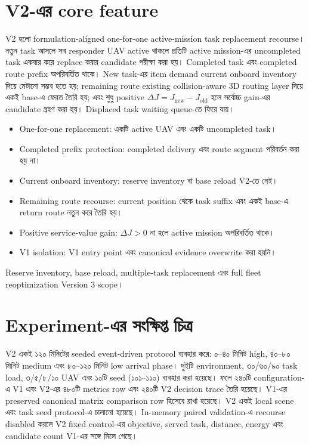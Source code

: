 \documentclass[10pt,a4paper]{article}
\begin{document}
\section{V2-এর core feature}
V2 হলো formulation-aligned one-for-one active-mission task replacement recourse। নতুন task আসলে সব responder UAV active থাকলে প্রতিটি active mission-এর uncompleted task একবার করে replace করার candidate পরীক্ষা করা হয়। Completed task এবং completed route prefix অপরিবর্তিত থাকে। New task-এর item demand current onboard inventory দিয়ে মেটানো সম্ভব হতে হয়; remaining route existing collision-aware 3D routing layer দিয়ে একই base-এ ফেরত তৈরি হয়; এবং শুধু positive $\Delta J=J_{\mathrm{new}}-J_{\mathrm{old}}$ হলে সর্বোচ্চ gain-এর candidate গ্রহণ করা হয়। Displaced task waiting queue-তে ফিরে যায়।
\begin{itemize}
\item One-for-one replacement: একটি active UAV এবং একটি uncompleted task।
\item Completed prefix protection: completed delivery এবং route segment পরিবর্তন করা হয় না।
\item Current onboard inventory: reserve inventory বা base reload V2-তে নেই।
\item Remaining route recourse: current position থেকে task suffix এবং একই base-এ return route নতুন করে তৈরি হয়।
\item Positive service-value gain: $\Delta J>0$ না হলে active mission অপরিবর্তিত থাকে।
\item V1 isolation: V1 entry point এবং canonical evidence overwrite করা হয়নি।
\end{itemize}
Reserve inventory, base reload, multiple-task replacement এবং full fleet reoptimization Version 3 scope।
\section{Experiment-এর সংক্ষিপ্ত চিত্র}
V2 একই ১২০ মিনিটের seeded event-driven protocol ব্যবহার করে: ০--৪০ মিনিট high, ৪০--৮০ মিনিট medium এবং ৮০--১২০ মিনিট low arrival phase। দুইটি environment, ৩০/৬০/৯০ task load, ৩/৫/৮/১০ UAV এবং ১০টি seed (১০১--১১০) ব্যবহার করা হয়েছে। ফলে ২৪০টি configuration-এ V1 এবং V2-এর ৪৮০টি metrics row এবং ২৪০টি V2 decision trace তৈরি হয়েছে।
V1-এর preserved canonical matrix comparison row হিসেবে রাখা হয়েছে। V2 একই local scene এবং task seed protocol-এ চালানো হয়েছে। In-memory paired validation-এ recourse disabled করলে V2 fixed control-এর objective, served task, distance, energy এবং candidate count V1-এর সঙ্গে মিলে গেছে।
\end{document}
